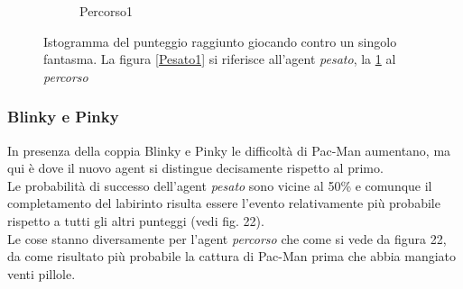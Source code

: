 \documentclass[8pt]{book}
\begin{document}
\begin{figure}
\begin{subfigure}[b]{0.49\textwidth}
    \caption{Percorso1}
    \label{Percorso1}
  \end{subfigure}
  \caption{Istogramma del punteggio raggiunto giocando contro un singolo fantasma. La figura \ref{Pesato1} si riferisce all'agent \emph{pesato}, la \ref{Percorso1} al \emph{percorso}}
  \label{pesatoPercorso1}
\end{figure}


\subsubsection{Blinky e Pinky}

In presenza della coppia Blinky e Pinky le difficoltà di Pac-Man aumentano, ma qui è dove il nuovo agent si distingue decisamente rispetto al primo.\\
Le probabilità di successo dell'agent \emph{pesato} sono vicine al 50\% e comunque il completamento del labirinto risulta essere l'evento relativamente più probabile rispetto a tutti gli altri punteggi (vedi fig. 22).\\
Le cose stanno diversamente per l'agent \emph{percorso} che come si vede da figura 22, da come risultato più probabile la cattura di Pac-Man prima che abbia mangiato venti pillole.
\end{document}
